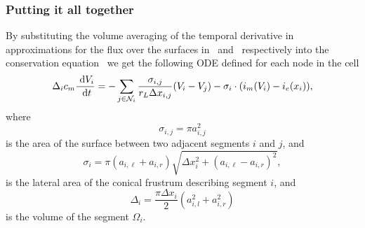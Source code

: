 \subsubsection{Putting it all together}
By substituting the volume averaging of the temporal derivative in~ approximations for the flux over the surfaces in~ and~ respectively into the conservation equation~ we get the following ODE defined for each node in the cell
\begin{equation}
    \Delta_i c_m \frac{~\text{d}{V_i}}{~\text{d}{t}}
       = -\sum_{j\in\mathcal{N}_i} {\frac{\sigma_{i,j}}{r_L \Delta x_{i,j}} (V_i-V_j)} - \sigma_i\cdot(i_m(V_i) - i_e(x_i)),
    \label{eq:ode}
\end{equation}
where
\begin{equation}
    \sigma_{i,j} = \pi a_{i,j}^2
    \label{eq:sigma_ij}
\end{equation}
is the area of the surface between two adjacent segments $i$ and $j$, and
\begin{equation}
    \sigma_{i}   = \pi(a_{i,\ell} + a_{i,r}) \sqrt{\Delta x_i^2 + (a_{i,\ell} - a_{i,r})^2},
    \label{eq:sigma_i}
\end{equation}
is the lateral area of the conical frustrum describing segment $i$, and
\begin{equation}
    \Delta_{i}   = \frac{\pi\Delta x_i}{2} \left( a_{i,l}^2 + a_{i,r}^2 \right)
    \label{eq:delta_i}
\end{equation}
is the volume of the segment $\Omega_i$.

